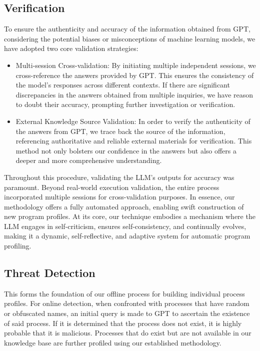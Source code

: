 \subsection{Verification}

To ensure the authenticity and accuracy of the information obtained from GPT, considering the potential biases or misconceptions of machine learning models, we have adopted two core validation strategies:

\begin{itemize}
    \item Multi-session Cross-validation: By initiating multiple independent sessions, we cross-reference the answers provided by GPT. This ensures the consistency of the model's responses across different contexts. If there are significant discrepancies in the answers obtained from multiple inquiries, we have reason to doubt their accuracy, prompting further investigation or verification.
    \item External Knowledge Source Validation: In order to verify the authenticity of the answers from GPT, we trace back the source of the information, referencing authoritative and reliable external materials for verification. This method not only bolsters our confidence in the answers but also offers a deeper and more comprehensive understanding.
\end{itemize}

Throughout this procedure, validating the LLM's outputs for accuracy was paramount. Beyond real-world execution validation, the entire process incorporated multiple sessions for cross-validation purposes.
In essence, our methodology offers a fully automated approach, enabling swift construction of new program profiles. At its core, our technique embodies a mechanism where the LLM engages in self-criticism, ensures self-consistency, and continually evolves, making it a dynamic, self-reflective, and adaptive system for automatic program profiling.


\subsection{Threat Detection}

This forms the foundation of our offline process for building individual process profiles. For online detection, when confronted with processes that have random or obfuscated names, an initial query is made to GPT to ascertain the existence of said process. If it is determined that the process does not exist, it is highly probable that it is malicious. Processes that do exist but are not available in our knowledge base are further profiled using our established methodology.


